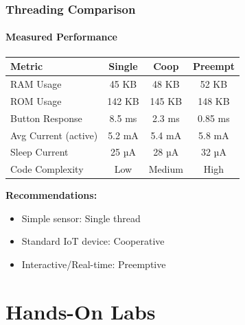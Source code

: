 \documentclass{beamer}
\begin{document}
\begin{frame}
\frametitle{Threading Comparison}
\framesubtitle{Measured Performance}

\begin{table}
\footnotesize
\begin{tabular}{|l|c|c|c|}
\hline
\textbf{Metric} & \textbf{Single} & \textbf{Coop} & \textbf{Preempt} \\
\hline
RAM Usage & 45 KB & 48 KB & 52 KB \\
ROM Usage & 142 KB & 145 KB & 148 KB \\
Button Response & 8.5 ms & 2.3 ms & 0.85 ms \\
Avg Current (active) & 5.2 mA & 5.4 mA & 5.8 mA \\
Sleep Current & 25 µA & 28 µA & 32 µA \\
Code Complexity & Low & Medium & High \\
\hline
\end{tabular}
\end{table}

\textbf{Recommendations:}
\begin{itemize}
    \item Simple sensor: Single thread
    \item Standard IoT device: Cooperative
    \item Interactive/Real-time: Preemptive
\end{itemize}
\end{frame}

\section{Hands-On Labs}
\end{document}
